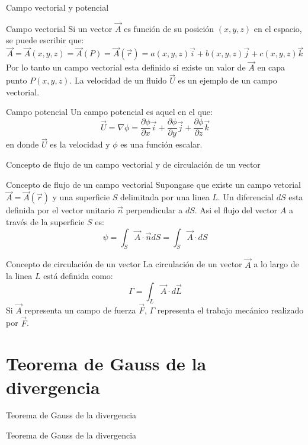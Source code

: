 \documentclass [xcolor=svgnames, t] {beamer}
\begin{document}
\begin{frame}{Campo vectorial y potencial}
\vspace{-0.5cm}
\begin{block}{Campo vectorial}
Si un vector $\vec{A}$ es funci\'on de su posici\'on $(x,y,z)$ en el espacio, se puede escribir que:
$$
\vec{A} = \vec{A}(x,y,z) = \vec{A}(P) = \vec{A}(\vec{r}) = a(x,y,z)\vec{i} + b(x,y,z)\vec{j} + c(x,y,z)\vec{k}
$$
Por lo tanto un \alert{campo vectorial} esta definido si existe un valor de $\vec{A}$ en capa punto $P(x,y,z)$. La velocidad de un fluido $\vec{U}$ es un ejemplo de un campo vectorial.
\end{block}
\begin{block}{Campo potencial}
Un campo potencial es aquel en el que:
$$
\vec{U} = \nabla \phi = \frac{\partial \phi}{\partial x}\vec{i} + \frac{\partial \phi}{\partial y}\vec{j} + \frac{\partial \phi}{\partial z}\vec{k}
$$
en donde $\vec{U}$ es la velocidad y $\phi$ es una funci\'on escalar.
\end{block}
\end{frame}

\begin{frame}{Concepto de flujo de un campo vectorial y de circulaci\'on de un vector}
\vspace{-0.5cm}
\begin{block}{Concepto de flujo de un campo vectorial}
Supongase que existe un campo vetorial $\vec{A}=\vec{A}(\vec{r})$ y una superficie $S$ delimitada por una linea $L$. Un diferencial $dS$  esta definida por el vector unitario $\vec{n}$ perpendicular a $dS$. Asi el flujo del vector $A$ a trav\'es de la superficie $S$ es:
$$
\psi = \int_S \vec{A} \cdot \vec{n}dS = \int_S \vec{A} \cdot dS 
$$
\end{block}
\vspace{-0.23cm}
\begin{block}{Concepto de circulaci\'on de un vector}
La circulaci\'on de un vector $\vec{A}$ a lo largo de la linea $L$ est\'a definida como:
$$
\Gamma = \int_L \vec{A} \cdot d\vec{L}
$$
Si $\vec{A}$ representa un campo de fuerza $\vec{F}$, $\Gamma$ representa el trabajo mec\'anico realizado por $\vec{F}$.
\end{block}
\end{frame}

\section{Teorema de Gauss de la divergencia}
\begin{frame}{Teorema de Gauss de la divergencia}
\begin{block}{Teorema de Gauss de la divergencia}

\end{block}
\end{frame}
\end{document}
